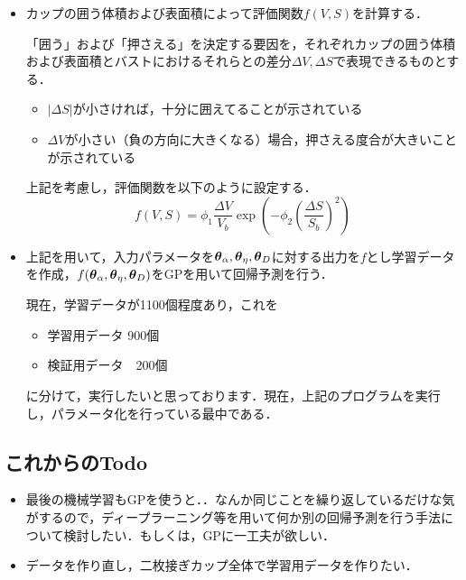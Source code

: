 \documentclass[11pt]{jsarticle}
\begin{document}
\begin{itemize}
				\item カップの囲う体積および表面積によって評価関数$ f(V,S) $を計算する．
				
				「囲う」および「押さえる」を決定する要因を，それぞれカップの囲う体積および表面積とバストにおけるそれらとの差分$\Delta V,\Delta S $で表現できるものとする．
				\begin{itemize}
					\item $ |\Delta S| $が小さければ，十分に囲えてることが示されている
					\item $ \Delta V $が小さい（負の方向に大きくなる）場合，押さえる度合が大きいことが示されている
				\end{itemize}
				上記を考慮し，評価関数を以下のように設定する．
				\begin{equation}\label{eq:EvalFunc}
					f(V,S) = \phi_1 \frac{\Delta V}{V_b} \exp \left(-\phi_2 \left(\frac{\Delta S}{S_b}\right)^2 \right)
				\end{equation}
				
				\item 上記を用いて，入力パラメータを$ \boldsymbol{\theta}_{\alpha},\boldsymbol{\theta}_{\eta},\boldsymbol{\theta}_{D} $に対する出力を$ f $とし学習データを作成，$ f(\boldsymbol{\theta}_{\alpha},\boldsymbol{\theta}_{\eta},\boldsymbol{\theta}_{D}) $をGPを用いて回帰予測を行う．
				
				現在，学習データが1100個程度あり，これを
				\begin{itemize}
					\item 学習用データ 900個
					\item 検証用データ　200個
				\end{itemize}
			に分けて，実行したいと思っております．現在，上記のプログラムを実行し，パラメータ化を行っている最中である．
			\end{itemize}
		\subsection{これからのTodo}
			\begin{itemize}
				\item 最後の機械学習もGPを使うと．．なんか同じことを繰り返しているだけな気がするので，ディープラーニング等を用いて何か別の回帰予測を行う手法について検討したい．もしくは，GPに一工夫が欲しい．
				\item データを作り直し，二枚接ぎカップ全体で学習用データを作りたい．
			\end{itemize}
			
	\newpage
\vspace{10cm}
	

\vspace{14cm}
	\articleSPRfour
	\articleSPRfive
\end{document}
